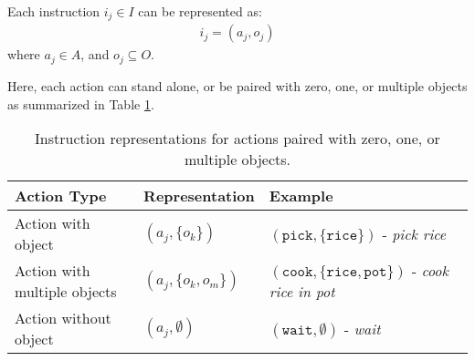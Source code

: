 \documentclass[a4paper,11pt]{lmcs}
\begin{document}
Each instruction \(i_j \in I\) can be represented as:
\begin{eqnarray}
\label{eq:ac_ob}
i_j = (a_j, o_j)
\end{eqnarray}
where \(a_j \in A\), and \(o_j \subseteq O\).

Here, each action can stand alone, or be paired with zero, one, or multiple objects as summarized in Table \ref{tab:ac_ob}.

\begin{table}[h!]
\label{tab:ac_ob}
\centering
\begin{tabular}{|l|l|l|}
\hline
\textbf{Action Type}           & \textbf{Representation}             & \textbf{Example}                \\
\hline
Action with object             & \((a_j, \{ o_k \})\)                & \((\texttt{pick}, \{\texttt{rice}\})\) - \emph{pick rice} \\
\hline
Action with multiple objects   & \((a_j, \{ o_k, o_m \})\)          & \((\texttt{cook}, \{\texttt{rice}, \texttt{pot}\})\) - \emph{cook rice in pot} \\
\hline
Action without object          & \((a_j, \emptyset)\)                & \((\texttt{wait}, \emptyset)\) - \emph{wait} \\
\hline
\end{tabular}
\caption{Instruction representations for actions paired with zero, one, or multiple objects.}
\end{table}
\end{document}
